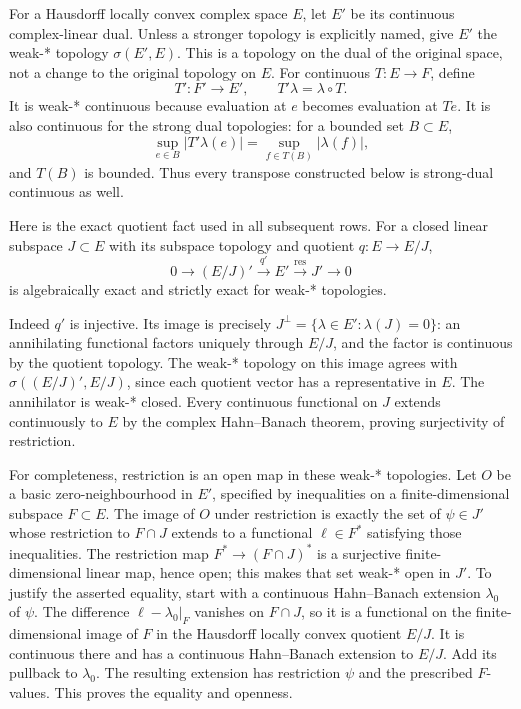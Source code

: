 For a Hausdorff locally convex complex space \(E\), let \(E'\) be its
continuous complex-linear dual. Unless a stronger topology is explicitly
named, give \(E'\) the weak-* topology \(\sigma(E',E)\). This is a
topology on the dual of the original space, not a change to the original
topology on \(E\). For continuous \(T:E\to F\), define \[
 T':F'\to E',\qquad T'\lambda=\lambda\circ T.
 \tag{ASD2.1}
\] It is weak-* continuous because evaluation at \(e\) becomes
evaluation at \(Te\). It is also continuous for the strong dual
topologies: for a bounded set \(B\subset E\), \[
 \sup_{e\in B}|T'\lambda(e)|
 =\sup_{f\in T(B)}|\lambda(f)|,
 \tag{ASD2.2}
\] and \(T(B)\) is bounded. Thus every transpose constructed below is
strong-dual continuous as well.

Here is the exact quotient fact used in all subsequent rows. For a
closed linear subspace \(J\subset E\) with its subspace topology and
quotient \(q:E\to E/J\), \[
 0\longrightarrow(E/J)'
 \xrightarrow{q'}E'\xrightarrow{\operatorname{res}}J'
 \longrightarrow0
 \tag{ASD2.3}
\] is algebraically exact and strictly exact for weak-* topologies.

Indeed \(q'\) is injective. Its image is precisely
\(J^\perp=\{\lambda\in E':\lambda(J)=0\}\): an annihilating functional
factors uniquely through \(E/J\), and the factor is continuous by the
quotient topology. The weak-* topology on this image agrees with
\(\sigma((E/J)',E/J)\), since each quotient vector has a representative
in \(E\). The annihilator is weak-* closed. Every continuous functional
on \(J\) extends continuously to \(E\) by the complex Hahn--Banach
theorem, proving surjectivity of restriction.

For completeness, restriction is an open map in these weak-* topologies.
Let \(O\) be a basic zero-neighbourhood in \(E'\), specified by
inequalities on a finite-dimensional subspace \(F\subset E\). The image
of \(O\) under restriction is exactly the set of \(\psi\in J'\) whose
restriction to \(F\cap J\) extends to a functional \(\ell\in F^*\)
satisfying those inequalities. The restriction map \(F^*\to(F\cap J)^*\)
is a surjective finite-dimensional linear map, hence open; this makes
that set weak-* open in \(J'\). To justify the asserted equality, start
with a continuous Hahn--Banach extension \(\lambda_0\) of \(\psi\). The
difference \(\ell-\lambda_0|_F\) vanishes on \(F\cap J\), so it is a
functional on the finite-dimensional image of \(F\) in the Hausdorff
locally convex quotient \(E/J\). It is continuous there and has a
continuous Hahn--Banach extension to \(E/J\). Add its pullback to
\(\lambda_0\). The resulting extension has restriction \(\psi\) and the
prescribed \(F\)-values. This proves the equality and openness.

